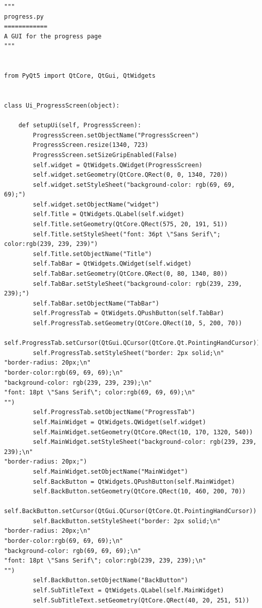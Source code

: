 \documentclass{article}
\begin{document}
\begin{lstlisting}
"""
progress.py
============
A GUI for the progress page
"""


from PyQt5 import QtCore, QtGui, QtWidgets


class Ui_ProgressScreen(object):

    def setupUi(self, ProgressScreen):
        ProgressScreen.setObjectName("ProgressScreen")
        ProgressScreen.resize(1340, 723)
        ProgressScreen.setSizeGripEnabled(False)
        self.widget = QtWidgets.QWidget(ProgressScreen)
        self.widget.setGeometry(QtCore.QRect(0, 0, 1340, 720))
        self.widget.setStyleSheet("background-color: rgb(69, 69, 69);")
        self.widget.setObjectName("widget")
        self.Title = QtWidgets.QLabel(self.widget)
        self.Title.setGeometry(QtCore.QRect(575, 20, 191, 51))
        self.Title.setStyleSheet("font: 36pt \"Sans Serif\"; color:rgb(239, 239, 239)")
        self.Title.setObjectName("Title")
        self.TabBar = QtWidgets.QWidget(self.widget)
        self.TabBar.setGeometry(QtCore.QRect(0, 80, 1340, 80))
        self.TabBar.setStyleSheet("background-color: rgb(239, 239, 239);")
        self.TabBar.setObjectName("TabBar")
        self.ProgressTab = QtWidgets.QPushButton(self.TabBar)
        self.ProgressTab.setGeometry(QtCore.QRect(10, 5, 200, 70))
        self.ProgressTab.setCursor(QtGui.QCursor(QtCore.Qt.PointingHandCursor))
        self.ProgressTab.setStyleSheet("border: 2px solid;\n"
"border-radius: 20px;\n"
"border-color:rgb(69, 69, 69);\n"
"background-color: rgb(239, 239, 239);\n"
"font: 18pt \"Sans Serif\"; color:rgb(69, 69, 69);\n"
"")
        self.ProgressTab.setObjectName("ProgressTab")
        self.MainWidget = QtWidgets.QWidget(self.widget)
        self.MainWidget.setGeometry(QtCore.QRect(10, 170, 1320, 540))
        self.MainWidget.setStyleSheet("background-color: rgb(239, 239, 239);\n"
"border-radius: 20px;")
        self.MainWidget.setObjectName("MainWidget")
        self.BackButton = QtWidgets.QPushButton(self.MainWidget)
        self.BackButton.setGeometry(QtCore.QRect(10, 460, 200, 70))
        self.BackButton.setCursor(QtGui.QCursor(QtCore.Qt.PointingHandCursor))
        self.BackButton.setStyleSheet("border: 2px solid;\n"
"border-radius: 20px;\n"
"border-color:rgb(69, 69, 69);\n"
"background-color: rgb(69, 69, 69);\n"
"font: 18pt \"Sans Serif\"; color:rgb(239, 239, 239);\n"
"")
        self.BackButton.setObjectName("BackButton")
        self.SubTitleText = QtWidgets.QLabel(self.MainWidget)
        self.SubTitleText.setGeometry(QtCore.QRect(40, 20, 251, 51))

\end{lstlisting}
\end{document}
